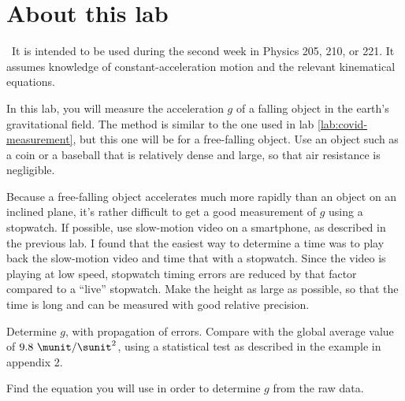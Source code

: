 \addtocounter{chapter}{-1}
\renewcommand\thechapter{c1.2}
\label{lab:covid-g}

\section*{About this lab}

\covid\ 
It is intended to be used during the second week in Physics 205, 210, or 221.
It assumes knowledge of constant-acceleration motion and the relevant kinematical equations.

\observations

In this lab, you will measure the acceleration $g$ of a falling object in the earth's
gravitational field. The method is similar to the one used in lab \ref{lab:covid-measurement},
but this one will be for a free-falling object. Use an object such as a coin or a baseball
that is relatively dense and large, so that air resistance is negligible.

Because a free-falling object accelerates much more rapidly than an object on an inclined
plane, it's rather difficult to get a good measurement of $g$ using a stopwatch. If possible,
use slow-motion video on a smartphone, as described in the previous lab. I found that the
easiest way to determine a time was to play back the slow-motion video and time that with
a stopwatch. Since the video is playing at low speed, stopwatch timing errors are reduced
by that factor compared to a ``live'' stopwatch. Make the height as
large as possible, so that the time is long and can be measured with good relative precision.


\analysis

Determine $g$, with propagation of errors. Compare with the global average value of $9.8\ \munit/\sunit^2$,
using a statistical test as described in the example in appendix 2.

\prelab

\prelabquestion  
Find the equation you will use in order to determine $g$ from the raw data.



